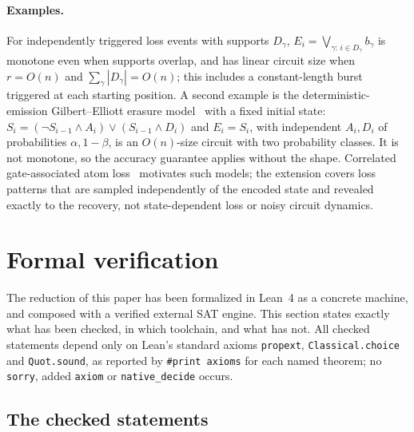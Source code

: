 \documentclass[11pt]{article}
\theoremstyle{remark}
\newcommand{\lean}[1]{\texttt{#1}}
\begin{document}
\paragraph{Examples.}
For independently triggered loss events with supports \(D_\gamma\),
\(E_i=\bigvee_{\gamma:\,i\in D_\gamma}b_\gamma\) is monotone even when
supports overlap, and has linear circuit size when \(r=O(n)\) and
\(\sum_\gamma|D_\gamma|=O(n)\); this includes a constant-length burst
triggered at each starting position. A second example is the
deterministic-emission Gilbert--Elliott erasure
model~\cite[Section VI]{adlercassuto2017} with a fixed initial state:
\(S_i=(\neg S_{i-1}\wedge A_i)\vee(S_{i-1}\wedge D_i)\) and \(E_i=S_i\),
with independent \(A_i,D_i\) of probabilities \(\alpha,1-\beta\), is an
\(O(n)\)-size circuit with two probability classes. It is not monotone,
so the accuracy guarantee applies without the shape. Correlated
gate-associated atom
loss~\cite{perrinloss2026,perrin2025atomloss,baranes2026loss} motivates
such models; the extension covers loss patterns that are sampled
independently of the encoded state and revealed exactly to the recovery,
not state-dependent loss or noisy circuit dynamics.

\section{Formal verification}
\label{sec:formal}

The reduction of this paper has been formalized in Lean~4 as a concrete
machine, and composed with a verified external SAT engine. This section
states exactly what has been checked, in which toolchain, and what has
not. All checked statements depend only on Lean's standard axioms
\lean{propext}, \lean{Classical.choice} and \lean{Quot.sound}, as
reported by \lean{\#print axioms} for each named theorem; no
\lean{sorry}, added \lean{axiom} or \lean{native\_decide} occurs.

\subsection{The checked statements}
\end{document}
